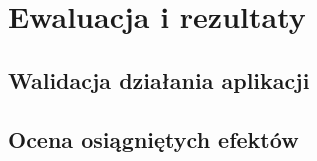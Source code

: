 \chapter{Ewaluacja i rezultaty}
\label{cha:ewaluacjaIRezultaty}

\section{Walidacja działania aplikacji}
\section{Ocena osiągniętych efektów}

